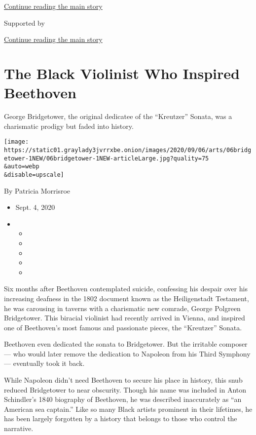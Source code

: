 \protect\hyperlink{after-top}{Continue reading the main story}

Supported by

\protect\hyperlink{after-sponsor}{Continue reading the main story}

\hypertarget{the-black-violinist-who-inspired-beethoven}{%
\section{The Black Violinist Who Inspired
Beethoven}\label{the-black-violinist-who-inspired-beethoven}}

George Bridgetower, the original dedicatee of the ``Kreutzer'' Sonata,
was a charismatic prodigy but faded into history.

\texttt{[image: https://static01.graylady3jvrrxbe.onion/images/2020/09/06/arts/06bridgetower-1NEW/06bridgetower-1NEW-articleLarge.jpg?quality=75\\\&auto=webp\\\&disable=upscale]}

By Patricia Morrisroe

\begin{itemize}
\item
  Sept. 4, 2020
\item
  \begin{itemize}
  \item
  \item
  \item
  \item
  \item
  \end{itemize}
\end{itemize}

Six months after Beethoven contemplated suicide, confessing his despair
over his increasing deafness in the 1802 document known as the
Heiligenstadt Testament, he was carousing in taverns with a charismatic
new comrade, George Polgreen Bridgetower. This biracial violinist had
recently arrived in Vienna, and inspired one of Beethoven's most famous
and passionate pieces, the ``Kreutzer'' Sonata.

Beethoven even dedicated the sonata to Bridgetower. But the irritable
composer --- who would later remove the dedication to Napoleon from his
Third Symphony --- eventually took it back.

While Napoleon didn't need Beethoven to secure his place in history,
this snub reduced Bridgetower to near obscurity. Though his name was
included in Anton Schindler's 1840 biography of Beethoven, he was
described inaccurately as ``an American sea captain.'' Like so many
Black artists prominent in their lifetimes, he has been largely
forgotten by a history that belongs to those who control the narrative.

